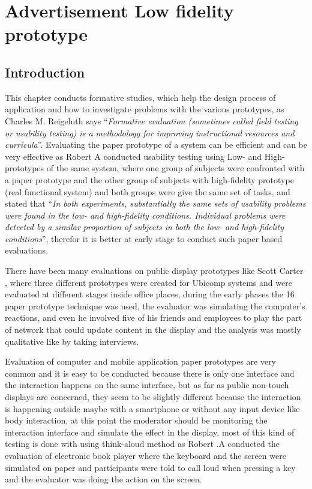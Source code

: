 \chapter{Advertisement Low fidelity prototype} %

\label{Chapter5} %
\newpage


\section{Introduction}
This chapter conducts formative studies, which help the design process of application and how to investigate problems with the various prototypes, as Charles M. Reigeluth \cite{formativestudy} says ``\emph{Formative evaluation (sometimes called field testing or usability testing) is a methodology for improving instructional resources and curricula}''. Evaluating the paper prototype of a system can be efficient \cite{lowfidelityefficient} and can be very effective as Robert A \cite{usabilityproblems} conducted usability testing using Low- and High-prototypes of the same system, where one group of subjects were confronted with a paper prototype and the other group of subjects with high-fidelity prototype (real functional system) and both groups were give the same set of tasks, and stated that ``\emph{In both experiments, substantially the same sets of usability problems were found in the low- and high-fidelity conditions. Individual problems were detected by a similar proportion of subjects in both the low- and high-fidelity conditions}'', therefor it is better at early stage to conduct such paper based evaluations.

There have been many evaluations on public display prototypes like Scott Carter \cite{prototypetesting1}, where three different prototypes were created for Ubicomp systems and were evaluated at different stages inside office places, during the early phases the 16 paper prototype technique was used, the evaluator was simulating the computer’s reactions, and even he involved five of his friends and employees to play the part of network that could update content in the display and the analysis was mostly qualitative like by taking interviews. 

Evaluation of computer and mobile application paper prototypes are very common and it is easy to be conducted because there is only one interface and the interaction happens on the same interface, but as far as public non-touch displays are concerned, they seem to be slightly different because the interaction is happening outside maybe with a smartphone or without any input device like body interaction, at this point the moderator should be monitoring the interaction interface and simulate the effect in the display, most of this kind of testing is done with using think-aloud method as Robert .A \cite{usabilityproblems} conducted the evaluation of electronic book player where the keyboard and the screen were simulated on paper and participants were told to call loud when pressing a key and the evaluator was doing the action on the screen.

